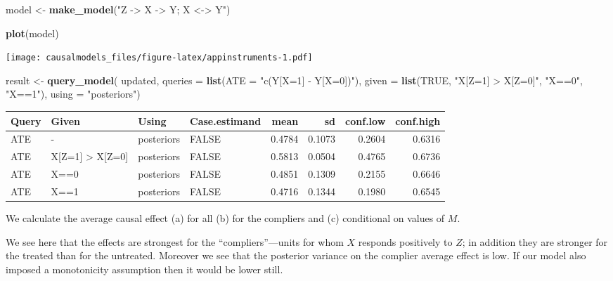 \documentclass[
  12pt,
]{book}
\newenvironment{Shaded}{\begin{snugshade}}{\end{snugshade}}
\newcommand{\AttributeTok}[1]{\textcolor[rgb]{0.13,0.29,0.53}{#1}}
\newcommand{\ConstantTok}[1]{\textcolor[rgb]{0.56,0.35,0.01}{#1}}
\newcommand{\FunctionTok}[1]{\textcolor[rgb]{0.13,0.29,0.53}{\textbf{#1}}}
\newcommand{\NormalTok}[1]{#1}
\newcommand{\OtherTok}[1]{\textcolor[rgb]{0.56,0.35,0.01}{#1}}
\newcommand{\StringTok}[1]{\textcolor[rgb]{0.31,0.60,0.02}{#1}}
\begin{document}
\begin{Shaded}
\begin{Highlighting}[]
\NormalTok{model }\OtherTok{\textless{}{-}} \FunctionTok{make\_model}\NormalTok{(}\StringTok{"Z {-}\textgreater{} X {-}\textgreater{} Y; X \textless{}{-}\textgreater{} Y"}\NormalTok{)  }

\FunctionTok{plot}\NormalTok{(model)}
\end{Highlighting}
\end{Shaded}

\texttt{[image: causalmodels\_files/figure-latex/appinstruments-1.pdf]}

\begin{Shaded}
\begin{Highlighting}[]
\NormalTok{result }\OtherTok{\textless{}{-}} \FunctionTok{query\_model}\NormalTok{(}
\NormalTok{    updated, }
    \AttributeTok{queries =} \FunctionTok{list}\NormalTok{(}\AttributeTok{ATE =} \StringTok{"c(Y[X=1] {-} Y[X=0])"}\NormalTok{), }
    \AttributeTok{given =} \FunctionTok{list}\NormalTok{(}\ConstantTok{TRUE}\NormalTok{, }\StringTok{"X[Z=1] \textgreater{} X[Z=0]"}\NormalTok{,  }\StringTok{"X==0"}\NormalTok{,  }\StringTok{"X==1"}\NormalTok{),}
    \AttributeTok{using =} \StringTok{"posteriors"}\NormalTok{)}
\end{Highlighting}
\end{Shaded}

\begin{tabular}{l|l|l|l|r|r|r|r}
\hline
Query & Given & Using & Case.estimand & mean & sd & conf.low & conf.high\\
\hline
ATE & - & posteriors & FALSE & 0.4784 & 0.1073 & 0.2604 & 0.6316\\
\hline
ATE & X[Z=1] > X[Z=0] & posteriors & FALSE & 0.5813 & 0.0504 & 0.4765 & 0.6736\\
\hline
ATE & X==0 & posteriors & FALSE & 0.4851 & 0.1309 & 0.2155 & 0.6646\\
\hline
ATE & X==1 & posteriors & FALSE & 0.4716 & 0.1344 & 0.1980 & 0.6545\\
\hline
\end{tabular}

We calculate the average causal effect (a) for all (b) for the compliers and (c) conditional on values of \(M\).

We see here that the effects are strongest for the ``compliers''---units for whom \(X\) responds positively to \(Z\); in addition they are stronger for the treated than for the untreated. Moreover we see that the posterior variance on the complier average effect is low. If our model also imposed a monotonicity assumption then it would be lower still.
\end{document}

